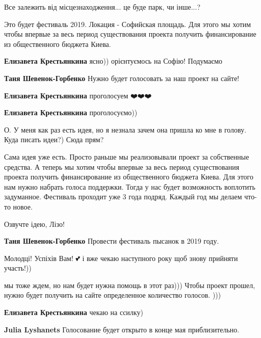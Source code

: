 Все залежить від місцезнаходження... це буде парк, чи інше...?

\begin{itemize} %

Это будет фестиваль 2019. Локация - Софийская площадь. Для этого мы хотим чтобы
впервые за весь период существования проекта получить финансирование из
общественного бюджета Киева.

\textbf{Елизавета Крестьянкина} ясно)) орієнтуємось на Софію! Подумаємо🌝

\textbf{Таня Шевенок-Горбенко} Нужно будет голосовать за наш проект на сайте!

\textbf{Елизавета Крестьянкина} проголосуем ❤️❤️❤️

\textbf{Елизавета Крестьянкина} проголосуємо))
\end{itemize} %


О. У меня как раз есть идея, но я незнала зачем она пришла ко мне в голову.
Куда писать идеи?) Сюда прям?

\begin{itemize} %

Сама идея уже есть. Просто раньше мы реализовывали проект за собственные
средства. А теперь мы хотим чтобы впервые за весь период существования проекта
получить финансирование из общественного бюджета Киева. Для этого нам нужно
набрать голоса поддержки. Тогда у нас будет возможность воплотить задуманное.
Фестиваль проходит уже 3 года подряд. Каждый год мы делаем что-то новое.


Озвучте ідею, Лізо!

\textbf{Таня Шевенок-Горбенко} Провести фестиваль пысанок в 2019 году.
\end{itemize} %


Молодці! Успіхів Вам! 💕 і вже чекаю наступного року щоб знову прийняти
участь!))

\begin{itemize} %

мы тоже ждем, но нам будет нужна помощь в этот раз))) Чтобы проект прошел,
нужно будет получить на сайте определенное количество голосов. )))

\textbf{Елизавета Крестьянкина} чекаю на ссилку)

\textbf{Julia Lyshanets} Голосование будет открыто в конце мая приблизительно.
\end{itemize} %

